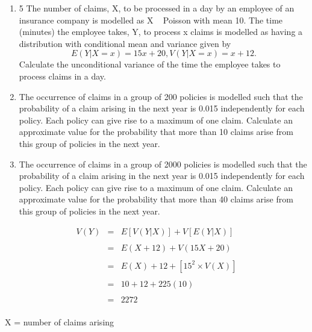 \documentclass[a4paper,12pt]{article}
\begin{document}
\begin{enumerate}
\item 5 The number of claims, X, to be processed in a day by an employee of an insurance company is modelled as X ~ Poisson with mean 10. The time (minutes) the
employee takes, Y, to process x claims is modelled as having a distribution with conditional mean and variance given by
\[E(Y|X = x) = 15x + 20 , V(Y|X = x) = x + 12.\]
Calculate the unconditional variance of the time the employee takes to process
claims in a day. 

 \item The occurrence of claims in a group of 200 policies is modelled such that
the probability of a claim arising in the next year is 0.015 independently for each policy. Each policy can give rise to a maximum of one claim.
Calculate an approximate value for the probability that more than 10 claims arise from this group of policies in the next year. 
\item The occurrence of claims in a group of 2000 policies is modelled such that
the probability of a claim arising in the next year is 0.015 independently for each policy. Each policy can give rise to a maximum of one claim. Calculate an approximate value for the probability that more than 40
claims arise from this group of policies in the next year. 


\end{enumerate}


\newpage

\begin{eqnarray*}
V(Y) 
&=& E[V(Y|X)] + V[E(Y|X)]\\
& & \\
&=&  E(X + 12) + V(15X + 20)\\
& & \\
&=& E(X) + 12 + [15^2   \times V(X)]\\
& & \\
&=& 10 + 12 + 225(10) \\
& & \\
&=& 2272\\
\end{eqnarray*}

  X = number of claims arising
\end{document}
